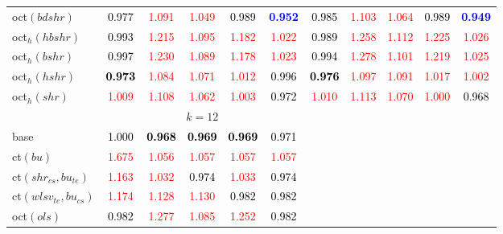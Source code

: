 \begin{tabular}[t]{l|>{}cccc>{}c|ccccc}
oct$(bdshr)$ & \textcolor{black}{0.977} & \textcolor{red}{1.091} & \textcolor{red}{1.049} & \textcolor{black}{0.989} & \textcolor{blue}{\textbf{0.952}} & \textcolor{black}{0.985} & \textcolor{red}{1.103} & \textcolor{red}{1.064} & \textcolor{black}{0.989} & \textcolor{blue}{\textbf{0.949}}\\
oct$_h(hbshr)$ & \textcolor{black}{0.993} & \textcolor{red}{1.215} & \textcolor{red}{1.095} & \textcolor{red}{1.182} & \textcolor{red}{1.022} & \textcolor{black}{0.989} & \textcolor{red}{1.258} & \textcolor{red}{1.112} & \textcolor{red}{1.225} & \textcolor{red}{1.026}\\
oct$_h(bshr)$ & \textcolor{black}{0.997} & \textcolor{red}{1.230} & \textcolor{red}{1.089} & \textcolor{red}{1.178} & \textcolor{red}{1.023} & \textcolor{black}{0.994} & \textcolor{red}{1.278} & \textcolor{red}{1.101} & \textcolor{red}{1.219} & \textcolor{red}{1.025}\\
oct$_h(hshr)$ & \textcolor{black}{\textbf{0.973}} & \textcolor{red}{1.084} & \textcolor{red}{1.071} & \textcolor{red}{1.012} & \textcolor{black}{0.996} & \textcolor{black}{\textbf{0.976}} & \textcolor{red}{1.097} & \textcolor{red}{1.091} & \textcolor{red}{1.017} & \textcolor{red}{1.002}\\
oct$_h(shr)$ & \textcolor{red}{1.009} & \textcolor{red}{1.108} & \textcolor{red}{1.062} & \textcolor{red}{1.003} & \textcolor{black}{0.972} & \textcolor{red}{1.010} & \textcolor{red}{1.113} & \textcolor{red}{1.070} & \textcolor{red}{1.000} & \textcolor{black}{0.968}\\
\addlinespace[0.3em]
\multicolumn{1}{c}{} & \multicolumn{5}{c}{\textbf{$k = 12$}} & \multicolumn{5}{c}{}\\
base & \textcolor{black}{1.000} & \textcolor{black}{\textbf{0.968}} & \textcolor{black}{\textbf{0.969}} & \textcolor{black}{\textbf{0.969}} & \textcolor{black}{0.971} &  &  &  &  & \\
ct$(bu)$ & \textcolor{red}{1.675} & \textcolor{red}{1.056} & \textcolor{red}{1.057} & \textcolor{red}{1.057} & \textcolor{red}{1.057} &  &  &  &  & \\
ct$(shr_{cs}, bu_{te})$ & \textcolor{red}{1.163} & \textcolor{red}{1.032} & \textcolor{black}{0.974} & \textcolor{red}{1.033} & \textcolor{black}{0.974} &  &  &  &  & \\
ct$(wlsv_{te}, bu_{cs})$ & \textcolor{red}{1.174} & \textcolor{red}{1.128} & \textcolor{red}{1.130} & \textcolor{black}{0.982} & \textcolor{black}{0.982} &  &  &  &  & \\
oct$(ols)$ & \textcolor{black}{0.982} & \textcolor{red}{1.277} & \textcolor{red}{1.085} & \textcolor{red}{1.252} & \textcolor{black}{0.982} &  &  &  &  & \\

\end{tabular}
